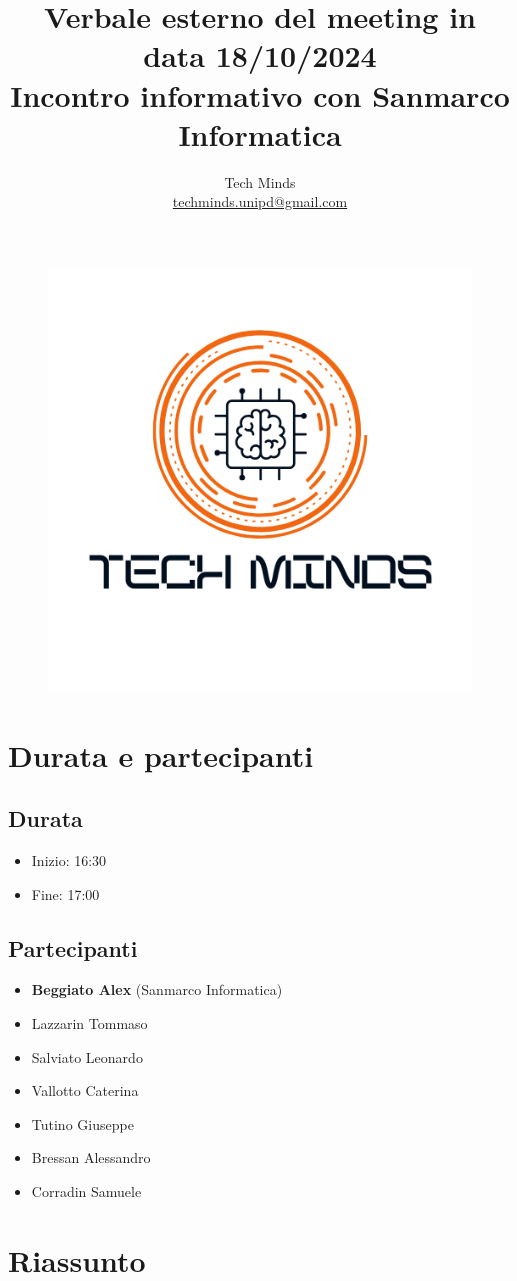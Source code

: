 \documentclass[10pt]{article}
\title{Verbale esterno del meeting in data 18/10/2024\\ \large{Incontro informativo con Sanmarco Informatica}}
\author{Tech Minds \\ \href{mailto:techminds.unipd@gmail.com}{techminds.unipd@gmail.com}}
\date{}
\begin{document}
\maketitle

\begin{figure}[h]
    \centering
    \includegraphics[width=0.4\linewidth]{../../../../assets/logo.png}
\end{figure}

\tableofcontents{\newpage}

\section{Durata e partecipanti}
\subsection{Durata}
\begin{itemize}
  \item Inizio: 16:30
  \item Fine: 17:00
\end{itemize}
\subsection{Partecipanti}
\begin{itemize}
    \item \textbf{Beggiato Alex} (Sanmarco Informatica)
    \item Lazzarin Tommaso
    \item Salviato Leonardo
    \item Vallotto Caterina
    \item Tutino Giuseppe
    \item Bressan Alessandro
    \item Corradin Samuele
\end{itemize}

\section{Riassunto}
\end{document}
